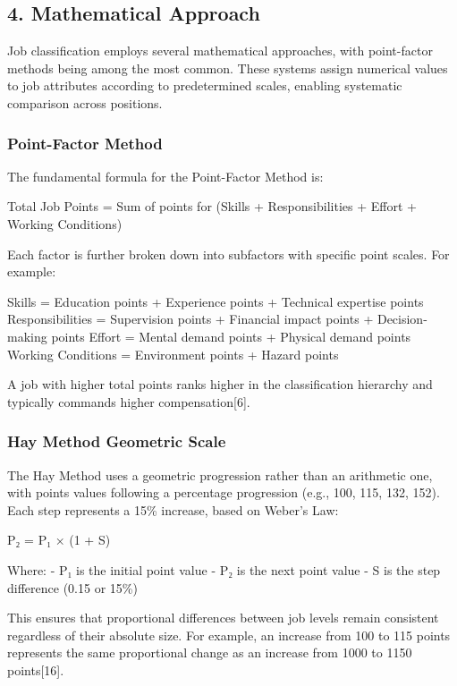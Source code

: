 \documentclass[
  letterpaper,
  DIV=11,
  numbers=noendperiod]{scrartcl}
\begin{document}
\subsection{4. Mathematical Approach}\label{mathematical-approach}

Job classification employs several mathematical approaches, with
point-factor methods being among the most common. These systems assign
numerical values to job attributes according to predetermined scales,
enabling systematic comparison across positions.

\subsubsection{Point-Factor Method}\label{point-factor-method}

The fundamental formula for the Point-Factor Method is:

Total Job Points = Sum of points for (Skills + Responsibilities + Effort
+ Working Conditions)

Each factor is further broken down into subfactors with specific point
scales. For example:

Skills = Education points + Experience points + Technical expertise
points Responsibilities = Supervision points + Financial impact points +
Decision-making points Effort = Mental demand points + Physical demand
points Working Conditions = Environment points + Hazard points

A job with higher total points ranks higher in the classification
hierarchy and typically commands higher compensation{[}6{]}.

\subsubsection{Hay Method Geometric
Scale}\label{hay-method-geometric-scale}

The Hay Method uses a geometric progression rather than an arithmetic
one, with points values following a percentage progression (e.g., 100,
115, 132, 152). Each step represents a 15\% increase, based on Weber's
Law:

P₂ = P₁ × (1 + S)

Where: - P₁ is the initial point value - P₂ is the next point value - S
is the step difference (0.15 or 15\%)

This ensures that proportional differences between job levels remain
consistent regardless of their absolute size. For example, an increase
from 100 to 115 points represents the same proportional change as an
increase from 1000 to 1150 points{[}16{]}.
\end{document}
